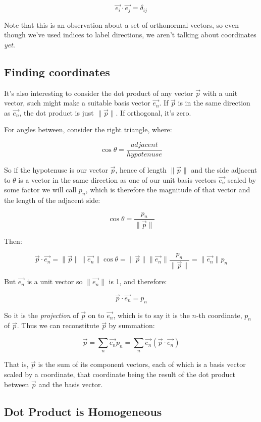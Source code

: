$$\vec{e_i} \cdot \vec{e_j} = \delta_{ij} $$

Note that this is an observation about a set of orthonormal vectors, so even though we've used indices to label directions, we aren't talking about coordinates \textit{yet}.

\subsection{Finding coordinates}

It's also interesting to consider the dot product of any vector $\vec{p}$ with a unit vector, such might make a suitable basis vector $\vec{e_n}$. If $\vec{p}$ is in the same direction as $\vec{e_n}$, the dot product is just $\|\vec{p}\|$. If orthogonal, it's zero.

For angles between, consider the right triangle, where:

$$\cos \theta = \frac{adjacent}{hypotenuse}$$

So if the hypotenuse is our vector $\vec{p}$, hence of length $\|\vec{p}\|$ and the side adjacent to $\theta$ is a vector in the same direction as one of our unit basis vectors $\vec{e_n}$ scaled by some factor we will call $p_n$, which is therefore the magnitude of that vector and the length of the adjacent side:

$$\cos \theta = \frac{p_n}{\|\vec{p}\|}$$

Then:

$$
\vec{p}\cdot\vec{e_n}
= \|\vec{p}\| \|\vec{e_n}\|\cos{\theta}
= \|\vec{p}\| \|\vec{e_n}\|\frac{p_n}{\|\vec{p}\|}
= \|\vec{e_n}\|p_n
$$

But $\vec{e_n}$ is a unit vector so $\|\vec{e_n}\|$ is 1, and therefore:

$$
\vec{p}\cdot\vec{e_n} = p_n
$$

So it is the \textit{projection} of $\vec{p}$ on to $\vec{e_n}$, which is to say it is the $n$-th coordinate, $p_n$ of $\vec{p}$. Thus we can reconstitute $\vec{p}$ by summation:

$$
\vec{p}
= \sum_n{\vec{e_n} p_n}
= \sum_n{\vec{e_n} \left( \vec{p} \cdot \vec{e_n} \right)}
$$

That is, $\vec{p}$ is the sum of its component vectors, each of which is a basis vector scaled by a coordinate, that coordinate being the result of the dot product between $\vec{p}$ and the basis vector.

\subsection{Dot Product is Homogeneous}

